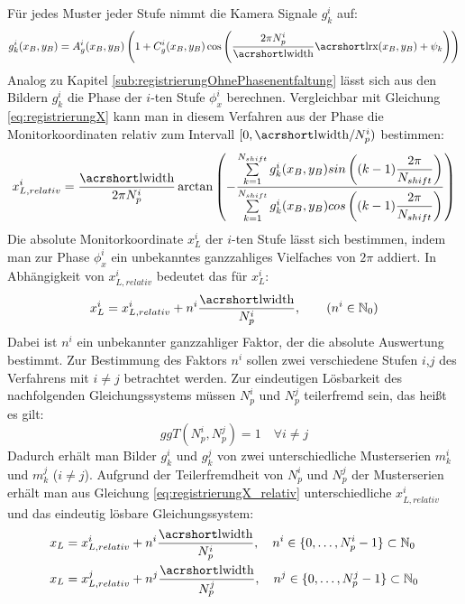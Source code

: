\noindent
Für jedes Muster jeder Stufe nimmt die Kamera Signale $g_k^i$ auf:
%
\begin{equation}\label{eq:kamerabild_mehrstufig}
	g_k^i(x_B, y_B) = A_g^i(x_B, y_B) \left(1 + C_g^i(x_B, y_B) \cos \left(\dfrac{2\pi N_p^i}{\acrshortmath{lwidth}}\acrshortmath{lrx}(x_B, y_B) + \psi_k\right)\right)
\end{equation}
%
Analog zu Kapitel \ref{sub:registrierungOhnePhasenentfaltung} lässt sich aus den Bildern $g_k^i$ die Phase der $i$-ten Stufe $\phi_x^i$ berechnen.
Vergleichbar mit Gleichung \ref{eq:registrierungX} kann man in diesem Verfahren aus der Phase die Monitorkoordinaten relativ zum Intervall $[0,\acrshortmath{lwidth}/N_p^i)$ bestimmen:
%
\begin{equation}\label{eq:registrierungX_relativ}
	x_{L,relativ}^i =
	\dfrac{\acrshortmath{lwidth}}{2\pi N_p^i}
	\arctan 
	\left( 
		-\dfrac
		{\sum\limits_{k=1}^{N_{shift}} g_k^i(x_B, y_B) sin\left((k - 1)\dfrac{2\pi}{N_{shift}}\right)}
		{\sum\limits_{k=1}^{N_{shift}} g_k^i(x_B, y_B) cos\left((k - 1)\dfrac{2\pi}{N_{shift}}\right)}
	\right)
\end{equation}
%
Die absolute Monitorkoordinate $x_L^i$ der $i$-ten Stufe lässt sich bestimmen, indem man zur Phase $\phi_x^i$ ein unbekanntes ganzzahliges Vielfaches von $2\pi$ addiert.
In Abhängigkeit von $x_{L,relativ}^i$ bedeutet das für $x_L^i$:
%
\begin{equation}\label{eq:registrierungX_absolut}
	x_L^i = x_{L,relativ}^i + n^i \dfrac{\acrshortmath{lwidth}}{N_p^i},
	\qquad
	(n^i \in \mathbb{N}_0)
\end{equation}
%
Dabei ist $n^i$ ein unbekannter ganzzahliger Faktor, der die absolute Auswertung bestimmt.
Zur Bestimmung des Faktors $n^i$ sollen zwei verschiedene Stufen $i$,$j$ des Verfahrens mit $i \neq j$ betrachtet werden.
Zur eindeutigen Lösbarkeit des nachfolgenden Gleichungssystems müssen $N_p^i$ und $N_p^j$ teilerfremd sein, das heißt es gilt:
%
\begin{equation*}
	ggT(N_p^i, N_p^j) = 1
	\quad
	\forall i \neq j
\end{equation*}
%
Dadurch erhält man Bilder $g_k^i$ und $g_k^j$ von zwei unterschiedliche Musterserien $m_k^i$ und $m_k^j$ ($i \neq j$).
Aufgrund der Teilerfremdheit von $N_p^i$ und $N_p^j$ der Musterserien erhält man aus Gleichung \ref{eq:registrierungX_relativ} unterschiedliche $x_{L,relativ}^i$ und das eindeutig lösbare Gleichungssystem:
%
\begin{equation}\label{eq:gleichungssystemRegistrierung}
	\begin{split}
		x_L & = x_{L,relativ}^i + n^i \dfrac{\acrshortmath{lwidth}}{N_p^i},
		\quad n^i \in \lbrace 0,\ldots, N_p^i - 1 \rbrace \subset \mathbb{N}_0\\
		x_L & = x_{L,relativ}^j + n^j \dfrac{\acrshortmath{lwidth}}{N_p^j},
		\quad n^j \in \lbrace 0,\ldots, N_p^j - 1 \rbrace \subset \mathbb{N}_0
	\end{split}
\end{equation}
